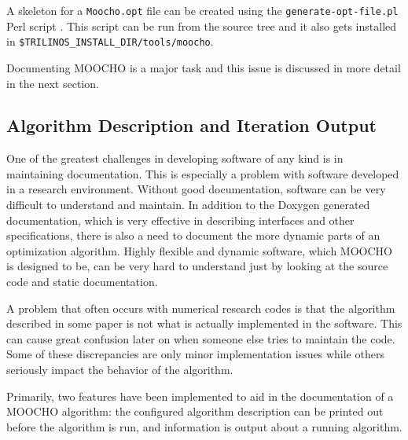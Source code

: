 \documentclass[pdf,12pt,report]{SANDreport}
\begin{document}
A skeleton for a {}\texttt{Moocho.opt} file can be created using the
{}\texttt{generate-opt-file.pl} Perl script {}\cite{ref:moochorefguide}.  This
script can be run from the source tree and it also gets installed in
{}\texttt{\$TRILINOS\-\_INSTALL\-\_DIR/tools/moocho}.

Documenting MOOCHO is a major task and this issue is discussed in more detail
in the next section.

%
\subsection{Algorithm Description and Iteration Output}
\label{moocho:sec:algo_descr_iter_out}
%

One of the greatest challenges in developing software of any kind is in
maintaining documentation.  This is especially a problem with software
developed in a research environment.  Without good documentation, software can
be very difficult to understand and maintain.  In addition to the Doxygen
generated documentation, which is very effective in describing interfaces and
other specifications, there is also a need to document the more dynamic parts
of an optimization algorithm.  Highly flexible and dynamic software, which
MOOCHO is designed to be, can be very hard to understand just by looking at
the source code and static documentation.

A problem that often occurs with numerical research codes is that the
algorithm described in some paper is not what is actually implemented in the
software.  This can cause great confusion later on when someone else tries to
maintain the code.  Some of these discrepancies are only minor implementation
issues while others seriously impact the behavior of the algorithm.

Primarily, two features have been implemented to aid in the documentation of a
MOOCHO algorithm: the configured algorithm description can be printed out
before the algorithm is run, and information is output about a running
algorithm.
\end{document}
